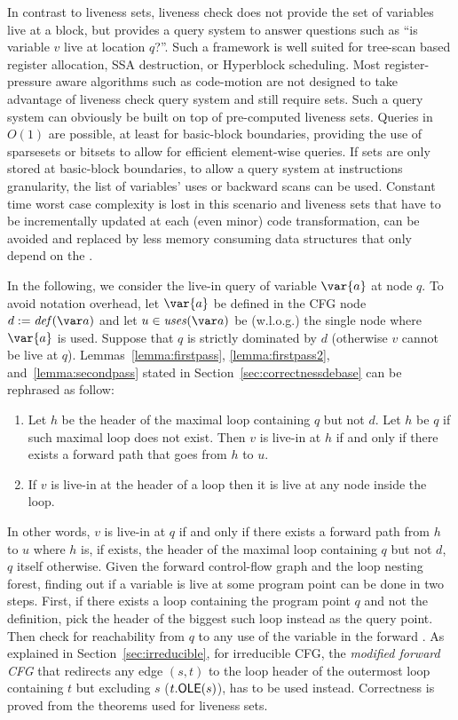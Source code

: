 In contrast to liveness sets, liveness check does not provide the set of variables live at a block, but provides a query system to answer questions such as ``is variable $v$ live at location $q$?''.
Such a framework is well suited for tree-scan based register allocation, SSA destruction, or Hyperblock scheduling.
Most register-pressure aware algorithms such as code-motion are not designed to take advantage of liveness check query system and still require sets.
Such a query system can obviously be built on top of pre-computed liveness sets.
Queries in $O(1)$ are possible, at least for basic-block boundaries, providing the use of sparsesets or bitsets to allow for efficient element-wise queries.
If sets are only stored at basic-block boundaries, to allow a query system at instructions granularity, the list of variables' uses or backward scans can be used.
Constant time worst case complexity is lost in this scenario and liveness sets that have to be incrementally updated at each (even minor) code transformation, can be avoided and replaced by less memory consuming data structures that only depend on the \@CFG.

In the following, we consider the live-in query of variable $\var{a}$ at node $q$.
To avoid notation overhead, let $\var{a}$ be defined in the CFG node $d:=\ldef{a}$ and let $u \in \luse{a}$ be (w.l.o.g.) the single node where $\var{a}$ is used.
Suppose that $q$ is strictly dominated by $d$ (otherwise $v$ cannot be live at $q$).
Lemmas~\ref{lemma:firstpass}, \ref{lemma:firstpass2}, and~\ref{lemma:secondpass} stated in Section~\ref{sec:correctnessdebase} can be rephrased as follow:
\begin{enumerate}
\item
	Let $h$ be the header of the maximal loop containing $q$ but not $d$.
	Let $h$ be $q$ if such maximal loop does not exist.
	Then $v$ is live-in at $h$ if and only if there exists a forward path that goes from $h$ to $u$.
\item
	If $v$ is live-in at the header of a loop then it is live at any node inside the loop.
\end{enumerate}

In other words, $v$ is live-in at $q$ if and only if there exists a forward path from $h$ to $u$ where $h$ is, if exists, the header of the maximal loop containing $q$ but not $d$, $q$ itself otherwise.
Given the forward control-flow graph and the loop nesting forest, finding out if a variable is live at some program point can be done in two steps.
First, if there exists a loop containing the program point $q$ and not the definition, pick the header of the biggest such loop instead as the query point.
Then check for reachability from $q$ to any use of the variable in the forward \@CFG.
As explained in Section~\ref{sec:irreducible}, for irreducible CFG, the \emph{modified forward CFG} that redirects any edge $(s,t)$ to the loop header of the outermost loop containing $t$ but excluding $s$ ($t.\textsf{OLE}(s)$), has to be used instead.
Correctness is proved from the theorems used for liveness sets.

